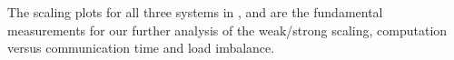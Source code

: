 \documentclass{sig-alternate}
\begin{document}
The scaling plots for all three
systems in ,  and  are the fundamental
measurements for our further analysis of the weak/strong scaling, computation
versus communication time and load imbalance.
\begin{figure}
  \centering
\end{figure}
\end{document}
